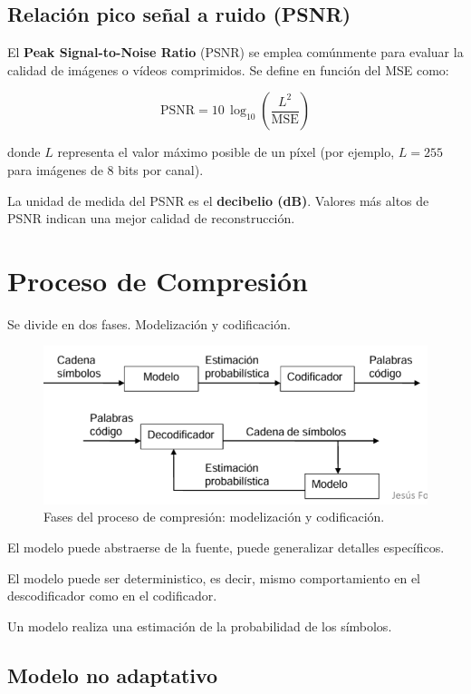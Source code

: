 \documentclass[11pt,a4paper]{article}
\begin{document}
\subsection*{Relación pico señal a ruido (PSNR)}

El \textbf{Peak Signal-to-Noise Ratio} (PSNR) se emplea comúnmente para evaluar la calidad de imágenes o vídeos comprimidos. Se define en función del MSE como:

\begin{equation}
    \mathrm{PSNR} = 10 \, \log_{10} \left( \frac{L^2}{\mathrm{MSE}} \right)
\end{equation}

donde $L$ representa el valor máximo posible de un píxel (por ejemplo, $L = 255$ para imágenes de 8 bits por canal).

La unidad de medida del PSNR es el \textbf{decibelio (dB)}. Valores más altos de PSNR indican una mejor calidad de reconstrucción.

\section{Proceso de Compresión}

Se divide en dos fases. Modelización y codificación.
\begin{figure}[!htbp]
	\centering
	\includegraphics[width=0.85\linewidth]{resources/Compression_Process.png}
	\caption{Fases del proceso de compresión: modelización y codificación.}
	\label{fig:compression-process}
\end{figure}

El modelo puede abstraerse de la fuente, puede generalizar detalles específicos.

El modelo puede ser deterministico, es decir, mismo comportamiento en el descodificador como en el codificador.

Un modelo realiza una estimación de la probabilidad de los símbolos.

\subsection{Modelo no adaptativo}
\end{document}
